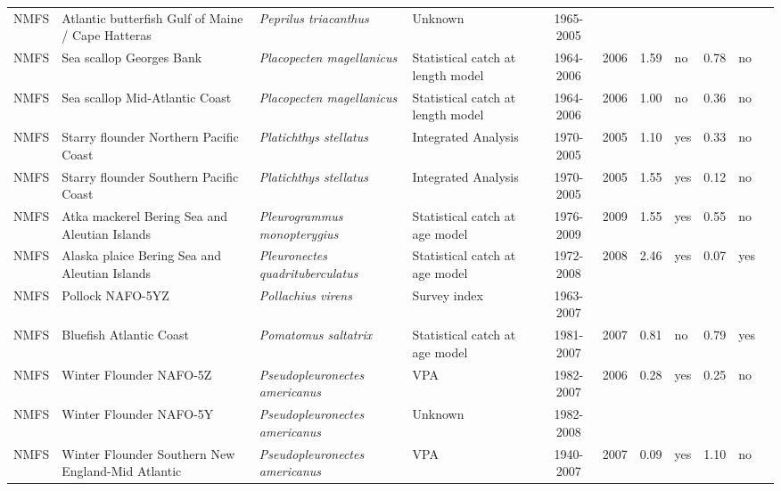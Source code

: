 \begin{longtable}{p{1.8cm}p{3.5cm}p{3.5cm}p{3cm}cccp{0.9cm}cp{0.9cm}c}
  NMFS & Atlantic butterfish Gulf of Maine / Cape Hatteras & \textit{Peprilus triacanthus} & Unknown & 1965-2005 &  &  &  &  &  & \cite{butterfish-assessment-2004.pdf} \\ 
  NMFS & Sea scallop Georges Bank & \textit{Placopecten magellanicus} & Statistical catch at length model & 1964-2006 & 2006 & 1.59 & no & 0.78 & no & \cite{SeaScallop2007.pdf} \\ 
  NMFS & Sea scallop Mid-Atlantic Coast & \textit{Placopecten magellanicus} & Statistical catch at length model & 1964-2006 & 2006 & 1.00 & no & 0.36 & no & \cite{SeaScallop2007.pdf} \\ 
  NMFS & Starry flounder Northern Pacific Coast & \textit{Platichthys stellatus} & Integrated Analysis & 1970-2005 & 2005 & 1.10 & yes & 0.33 & no & \cite{2005-SAFE-WCstarryflounder.pdf} \\ 
  NMFS & Starry flounder Southern Pacific Coast & \textit{Platichthys stellatus} & Integrated Analysis & 1970-2005 & 2005 & 1.55 & yes & 0.12 & no & \cite{2005-SAFE-WCstarryflounder.pdf} \\ 
  NMFS & Atka mackerel Bering Sea and Aleutian Islands & \textit{Pleurogrammus monopterygius} & Statistical catch at age model & 1976-2009 & 2009 & 1.55 & yes & 0.55 & no & \cite{2008_SAFE_BSAIatka.pdf} \\ 
  NMFS & Alaska plaice Bering Sea and Aleutian Islands & \textit{Pleuronectes quadrituberculatus} & Statistical catch at age model & 1972-2008 & 2008 & 2.46 & yes & 0.07 & yes & \cite{AFSC-ALPLAICBSAI-2008-Alaska plaice BSAI.pdf} \\ 
  NMFS & Pollock NAFO-5YZ & \textit{Pollachius virens} & Survey index & 1963-2007 &  &  &  &  &  & \cite{http://www.nefsc.noaa.gov/nefsc/publications/crd/crd0815/crd0815.pdf} \\ 
  NMFS & Bluefish Atlantic Coast & \textit{Pomatomus saltatrix} & Statistical catch at age model & 1981-2007 & 2007 & 0.81 & no & 0.79 & yes & \cite{final-2005-SAW-41-assessment.pdf} \\ 
  NMFS & Winter Flounder NAFO-5Z & \textit{Pseudopleuronectes americanus} & VPA & 1982-2007 & 2006 & 0.28 & yes & 0.25 & no & \cite{garm3k.pdf} \\ 
  NMFS & Winter Flounder NAFO-5Y & \textit{Pseudopleuronectes americanus} & Unknown & 1982-2008 &  &  &  &  &  & \cite{http://www.nefsc.noaa.gov/nefsc/publications/crd/crd0815/crd0815.pdf} \\ 
  NMFS & Winter Flounder Southern New England-Mid Atlantic & \textit{Pseudopleuronectes americanus} & VPA & 1940-2007 & 2007 & 0.09 & yes & 1.10 & no & \cite{NMFS-SNEMATL-Pseudopleuronectesamercianus-2008.pdf} \\ 

\end{longtable}
